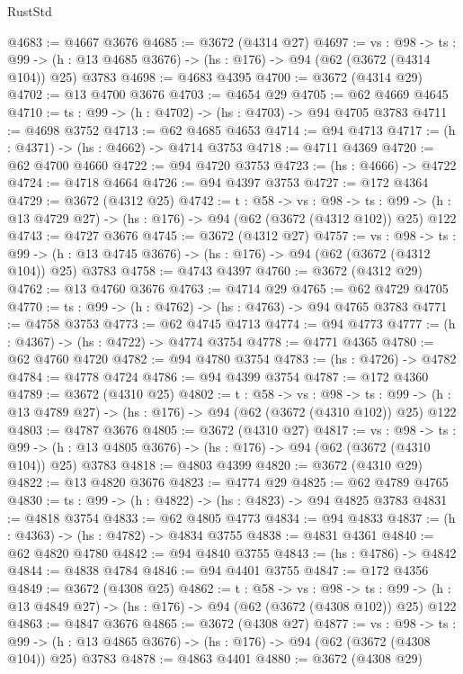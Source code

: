 \begin{lexlean}{RustStd}
\begin{coremodule}
{\begin{coremodule}
{{{{{{{{{{{@4683 := @4667 @3676
@4685 := @3672 (@4314 @27)
@4697 := {vs : @98} ->
  {ts : @99} -> (h : @13 @4685 @3676) -> (hs : @176) -> @94 (@62 (@3672 (@4314 @104)) @25) @3783
@4698 := @4683 @4395
@4700 := @3672 (@4314 @29)
@4702 := @13 @4700 @3676
@4703 := @4654 @29
@4705 := @62 @4669 @4645
@4710 := {ts : @99} -> (h : @4702) -> (hs : @4703) -> @94 @4705 @3783
@4711 := @4698 @3752
@4713 := @62 @4685 @4653
@4714 := @94 @4713
@4717 := (h : @4371) -> (hs : @4662) -> @4714 @3753
@4718 := @4711 @4369
@4720 := @62 @4700 @4660
@4722 := @94 @4720 @3753
@4723 := (hs : @4666) -> @4722
@4724 := @4718 @4664
@4726 := @94 @4397 @3753
@4727 := @172 @4364
@4729 := @3672 (@4312 @25)
@4742 := {t : @58} ->
  {vs : @98} ->
  {ts : @99} -> (h : @13 @4729 @27) -> (hs : @176) -> @94 (@62 (@3672 (@4312 @102)) @25) @122
@4743 := @4727 @3676
@4745 := @3672 (@4312 @27)
@4757 := {vs : @98} ->
  {ts : @99} -> (h : @13 @4745 @3676) -> (hs : @176) -> @94 (@62 (@3672 (@4312 @104)) @25) @3783
@4758 := @4743 @4397
@4760 := @3672 (@4312 @29)
@4762 := @13 @4760 @3676
@4763 := @4714 @29
@4765 := @62 @4729 @4705
@4770 := {ts : @99} -> (h : @4762) -> (hs : @4763) -> @94 @4765 @3783
@4771 := @4758 @3753
@4773 := @62 @4745 @4713
@4774 := @94 @4773
@4777 := (h : @4367) -> (hs : @4722) -> @4774 @3754
@4778 := @4771 @4365
@4780 := @62 @4760 @4720
@4782 := @94 @4780 @3754
@4783 := (hs : @4726) -> @4782
@4784 := @4778 @4724
@4786 := @94 @4399 @3754
@4787 := @172 @4360
@4789 := @3672 (@4310 @25)
@4802 := {t : @58} ->
  {vs : @98} ->
  {ts : @99} -> (h : @13 @4789 @27) -> (hs : @176) -> @94 (@62 (@3672 (@4310 @102)) @25) @122
@4803 := @4787 @3676
@4805 := @3672 (@4310 @27)
@4817 := {vs : @98} ->
  {ts : @99} -> (h : @13 @4805 @3676) -> (hs : @176) -> @94 (@62 (@3672 (@4310 @104)) @25) @3783
@4818 := @4803 @4399
@4820 := @3672 (@4310 @29)
@4822 := @13 @4820 @3676
@4823 := @4774 @29
@4825 := @62 @4789 @4765
@4830 := {ts : @99} -> (h : @4822) -> (hs : @4823) -> @94 @4825 @3783
@4831 := @4818 @3754
@4833 := @62 @4805 @4773
@4834 := @94 @4833
@4837 := (h : @4363) -> (hs : @4782) -> @4834 @3755
@4838 := @4831 @4361
@4840 := @62 @4820 @4780
@4842 := @94 @4840 @3755
@4843 := (hs : @4786) -> @4842
@4844 := @4838 @4784
@4846 := @94 @4401 @3755
@4847 := @172 @4356
@4849 := @3672 (@4308 @25)
@4862 := {t : @58} ->
  {vs : @98} ->
  {ts : @99} -> (h : @13 @4849 @27) -> (hs : @176) -> @94 (@62 (@3672 (@4308 @102)) @25) @122
@4863 := @4847 @3676
@4865 := @3672 (@4308 @27)
@4877 := {vs : @98} ->
  {ts : @99} -> (h : @13 @4865 @3676) -> (hs : @176) -> @94 (@62 (@3672 (@4308 @104)) @25) @3783
@4878 := @4863 @4401
@4880 := @3672 (@4308 @29)
}}}}}}}}}}}
\end{coremodule}}
\end{coremodule}
\end{lexlean}
